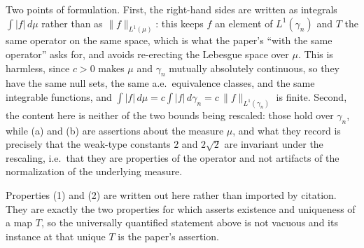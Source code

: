 \begin{corollary}
Two points of formulation.  First, the right-hand sides are written as integrals
$\int|f|\,d\mu$ rather than as $\|f\|_{L^1(\mu)}$: this keeps $f$ an element of
$L^1(\gamma_n)$ and $T$ the same operator on the same space, which is what the
paper's ``with the same operator'' asks for, and avoids re-erecting the Lebesgue
space over $\mu$.  This is harmless, since $c > 0$ makes $\mu$ and $\gamma_n$
mutually absolutely continuous, so they have the same null sets, the same
a.e.\ equivalence classes, and the same integrable functions, and
$\int|f|\,d\mu = c\int|f|\,d\gamma_n = c\,\|f\|_{L^1(\gamma_n)}$ is finite.
Second, the content here is neither of the two bounds being rescaled: those hold
over $\gamma_n$, while (a) and (b) are assertions about the measure $\mu$, and
what they record is precisely that the weak-type constants $2$ and $2\sqrt2$ are
invariant under the rescaling, i.e.\ that they are properties of the operator and
not artifacts of the normalization of the underlying measure.

Properties (1) and (2) are written out here rather than imported by citation.
They are exactly the two properties for which  asserts
existence and uniqueness of a map $T$, so the universally quantified statement
above is not vacuous and its instance at that unique $T$ is the paper's
assertion.
\end{corollary}
